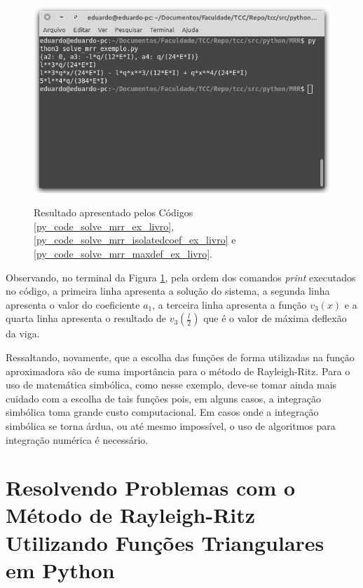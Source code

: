 \documentclass[
	12pt,				%
	openright,			%
    twoside,			%
	a4paper,			%
	english,			%
	french,				%
	spanish,			%
	brazil				%
	]{abntex2}
\numberwithin{lema}{chapter}
\numberwithin{teorema}{chapter}
\numberwithin{definicao}{chapter}
\numberwithin{exemplo}{chapter}
\numberwithin{figure}{chapter}
\begin{document}
\begin{figure}[h]
	\caption{Resultado apresentado pelos Códigos \ref{py_code_solve_mrr_ex_livro}, \ref{py_code_solve_mrr_isolatedcoef_ex_livro} e \ref{py_code_solve_mrr_maxdef_ex_livro}.}
	\centering
	\includegraphics[scale=2.5]{../figuras/code/code_solve_mrr_exec_complete.png}
	\label{fig:code_solve_mrr_exec_complete}
\end{figure}

Observando, no terminal da Figura \ref{fig:code_solve_mrr_exec_complete}, pela ordem dos comandos \textit{print} executados no código, a primeira linha apresenta a solução do sistema, a segunda linha apresenta o valor do coeficiente $a_1$, a terceira linha apresenta a função $v_3(x)$ e a quarta linha apresenta o resultado de $v_3(\frac{l}{2})$ que é o valor de máxima deflexão da viga.

Ressaltando, novamente, que a escolha das funções de forma utilizadas na função aproximadora são de suma importância para o método de Rayleigh-Ritz. Para o uso de matemática simbólica, como nesse exemplo, deve-se tomar ainda mais cuidado com a escolha de tais funções pois, em alguns casos, a integração simbólica toma grande custo computacional. Em casos onde a integração simbólica se torna árdua, ou até mesmo impossível, o uso de algoritmos para integração numérica é necessário.

\section{Resolvendo Problemas com o Método de Rayleigh-Ritz Utilizando Funções Triangulares em Python}
\label{sec:python_triangular}
\end{document}
